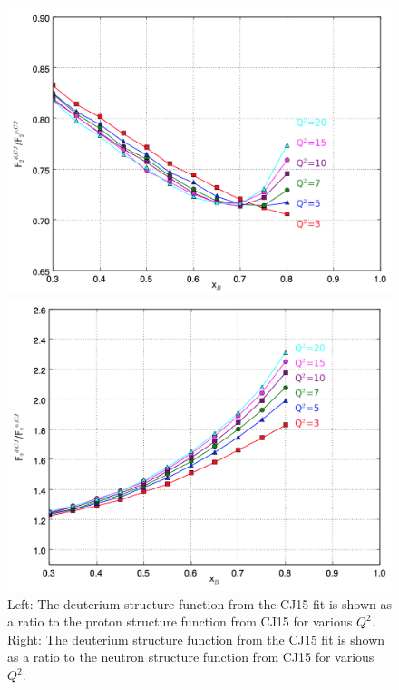 \documentclass[oneside]{article}
\begin{document}
 
 
  \begin{figure}
\begin{minipage}{0.5\textwidth}
 \includegraphics[width=\textwidth]{plots/dpratio_CJ.png}
\end{minipage}\hfill\begin{minipage}{0.5\textwidth}
 \includegraphics[width=\textwidth]{plots/dnratio_CJ.png}
 \end{minipage}
  \caption[Deuteron ratios from CJ15]{Left: The deuterium structure function from the CJ15 fit is shown as a ratio to the proton structure function from CJ15 for various $Q^2$. Right: The deuterium structure function from the CJ15 fit is shown as a ratio to the neutron structure function from CJ15 for various $Q^2$.}
  \label{fig:dratio_cj}
\end{figure} 
\end{document}
